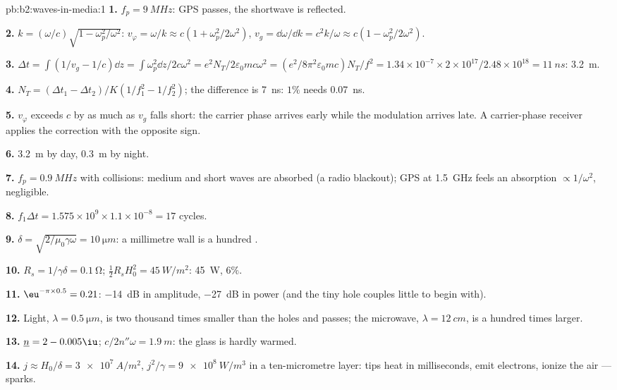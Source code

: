 \begin{solution}{pb:b2:waves-in-media:1}
\textbf{1.} $f_p = \qty{9}{MHz}$: GPS passes, the shortwave is reflected.

\textbf{2.} $k = (\omega/c)\sqrt{1 - \omega_p^2/\omega^2}$: $v_\varphi = \omega/k \approx c(1 + \omega_p^2/
2\omega^2)$, $v_g = \dd\omega/\dd k = c^2k/\omega \approx c(1 - \omega_p^2/2\omega^2)$.

\textbf{3.} $\Delta t = \int(1/v_g - 1/c)\dd z = \int\omega_p^2\dd z/2c\omega^2 = e^2N_T/2\varepsilon_0
mc\omega^2 = (e^2/8\pi^2\varepsilon_0mc)N_T/f^2 = 1.34 \times 10^{-7} \times 2 \times 10^{17}/2.48 \times
10^{18} = \qty{11}{ns}$: \qty{3.2}{m}.

\textbf{4.} $N_T = (\Delta t_1 - \Delta t_2)/K(1/f_1^2 - 1/f_2^2)$; the difference is
\qty{7}{ns}: $1\%$ needs \qty{0.07}{ns}.

\textbf{5.} $v_\varphi$ exceeds $c$ by as much as $v_g$ falls short: the
carrier phase arrives early while the modulation arrives late. A
carrier-phase receiver applies the correction with the opposite sign.

\textbf{6.} \qty{3.2}{m} by day, \qty{0.3}{m} by night.

\textbf{7.} $f_p = \qty{0.9}{MHz}$ with collisions: medium and short waves are
absorbed (a radio blackout); GPS at \qty{1.5}{GHz} feels an absorption
$\propto 1/\omega^2$, negligible.

\textbf{8.} $f_1\Delta t = 1.575 \times 10^9 \times 1.1 \times 10^{-8} = 17$ cycles.

\textbf{9.} $\delta = \sqrt{2/\mu_0\gamma\omega} = \qty{10}{\micro m}$: a millimetre wall is a
hundred .

\textbf{10.} $R_s = 1/\gamma\delta = \qty{0.1}{\ohm}$; $\tfrac12R_sH_0^2 = \qty{45}{W/m^2}$: \qty{45}{W},
$6\%$.

\textbf{11.} $\eu^{-\pi \times 0.5} = 0.21$: \qty{-14}{dB} in amplitude, \qty{-27}{dB} in
power (and the tiny hole couples little to begin with).

\textbf{12.} Light, $\lambda = \qty{0.5}{\micro m}$, is two thousand times smaller
than the holes and passes; the microwave, $\lambda = \qty{12}{cm}$, is a
hundred times larger.

\textbf{13.} $\underline n = 2 - 0.005\iu$; $c/2n''\omega = \qty{1.9}{m}$: the glass is
hardly warmed.

\textbf{14.} $j \approx H_0/\delta = \qty{3e7}{A/m^2}$, $j^2/\gamma = \qty{9e8}{W/m^3}$ in a
ten-micrometre layer: tips heat in milliseconds, emit electrons,
ionize the air --- sparks.


\end{solution}

